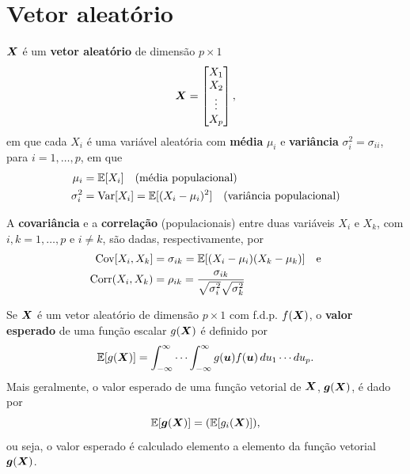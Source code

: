 \section{Vetor aleatório}

\begin{definition}
	$\bm{X}$ é um \textbf{vetor aleatório} de dimensão $p\times 1$
	\begin{equation}
		\bm{X} =
		\begin{bmatrix}
			X_1 \\
			X_2 \\
			\vdots \\
			X_p
		\end{bmatrix},
	\end{equation}
	em que cada $X_i$ é uma variável aleatória com \textbf{média} $\mu_i$ e \textbf{variância} $\sigma_i^2 = \sigma_{ii}$, para $i=1,\ldots,p$, em que
	\begin{align}
		\mu_i &= \operatorname{\mathbb{E}}[X_i] \quad \text{(média populacional)} \\
		\sigma_i^2 &= \operatorname{Var}[X_i] = \operatorname{\mathbb{E}}[(X_i-\mu_i)^2] \quad \text{(variância populacional)}
	\end{align}
\end{definition}

\begin{definition}
	A \textbf{covariância} e a \textbf{correlação} (populacionais) entre duas variáveis $X_i$ e $X_k$, com $i,k=1,\ldots,p$ e $i\neq k$, são dadas, respectivamente, por
	\begin{align}
		\operatorname{Cov}[X_i,X_k] &= \sigma_{ik} = \operatorname{\mathbb{E}}[(X_i-\mu_i)(X_k-\mu_k)] \quad \text{e} \\
		\operatorname{Corr}(X_i,X_k) &= \rho_{ik} = \frac{\sigma_{ik}}{\sqrt{\sigma_i^2}\sqrt{\sigma_k^2}}
	\end{align}
\end{definition}

\begin{definition}
	Se $\bm{X}$ é um vetor aleatório de dimensão $p\times 1$ com f.d.p. $f(\bm{X})$, o \textbf{valor esperado} de uma função escalar $g(\bm{X})$ é definido por
	\begin{equation}
		\operatorname{\mathbb{E}}[g(\bm{X})] = \int_{-\infty}^{\infty}\cdots\int_{-\infty}^{\infty} g(\bm{u})f(\bm{u})\,du_1\cdots du_p.
	\end{equation}
	Mais geralmente, o valor esperado de uma função vetorial de $\bm{X}$, $\bm{g}(\bm{X})$, é dado por
	\begin{equation}
		\operatorname{\mathbb{E}}[\bm{g}(\bm{X})] = (\operatorname{\mathbb{E}}[g_i(\bm{X})]),
	\end{equation}
	ou seja, o valor esperado é calculado elemento a elemento da função vetorial $\bm{g}(\bm{X})$.
\end{definition}


